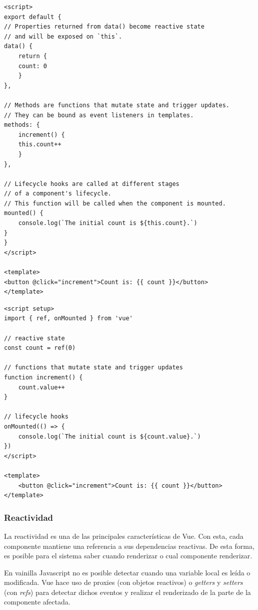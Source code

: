 \hspace{-0.65cm}\begin{minipage}{0.5\textwidth}
    \begin{lstlisting}[basicstyle=\ttfamily\tiny, numbers=none, caption=Options API.]
<script>
export default {
// Properties returned from data() become reactive state
// and will be exposed on `this`.
data() {
    return {
    count: 0
    }
},

// Methods are functions that mutate state and trigger updates.
// They can be bound as event listeners in templates.
methods: {
    increment() {
    this.count++
    }
},

// Lifecycle hooks are called at different stages
// of a component's lifecycle.
// This function will be called when the component is mounted.
mounted() {
    console.log(`The initial count is ${this.count}.`)
}
}
</script>

<template>
<button @click="increment">Count is: {{ count }}</button>
</template>
    \end{lstlisting}
\end{minipage}
\begin{minipage}{0.5\textwidth}
    \begin{lstlisting}[basicstyle=\ttfamily\tiny, numbers=none, caption=Composition API.]
<script setup>
import { ref, onMounted } from 'vue'

// reactive state
const count = ref(0)

// functions that mutate state and trigger updates
function increment() {
    count.value++
}

// lifecycle hooks
onMounted(() => {
    console.log(`The initial count is ${count.value}.`)
})
</script>

<template>
    <button @click="increment">Count is: {{ count }}</button>
</template>
    \end{lstlisting}
\end{minipage}

\subsubsection{Reactividad}

La reactividad es una de las principales características de Vue. Con esta, cada componente mantiene una referencia a sus dependencias reactivas. De esta forma, es posible para el sistema saber cuando renderizar o cual componente renderizar.

En vainilla Javascript no es posible detectar cuando una variable local es leída o modificada. Vue hace uso de proxies (con objetos reactivos) o \textit{getters} y \textit{setters} (con \textit{refs}) para detectar dichos eventos y realizar el renderizado de la parte de la componente afectada.


